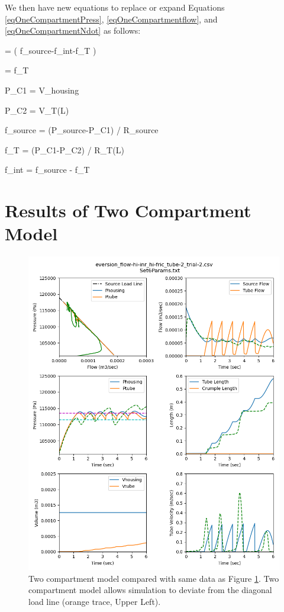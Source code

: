\documentclass[letterpaper]{article}
\begin{document}
We then have new equations to replace or expand Equations \ref{eqOneCompartmentPress}, \ref{eqOneCompartmentflow}, and \ref{eqOneCompartmentNdot}
as follows:

\beq
{} = ( f_{source}-f_{int}-f_T ) \cdot {}
\eeq

\beq
{} =   f_T \cdot {}
\eeq

\beq
P_{C1} =   {V_{housing}}
\eeq

\beq
P_{C2} =   {V_T(L)}
\eeq

\beq
f_{source} = (P_{source}-P_{C1}) /  R_{source}
\eeq

\beq
f_{T} = (P_{C1}-P_{C2}) /  R_{T}(L)
\eeq

\beq
f_{int} = f_{source} - f_T
\eeq

\section{Results of Two Compartment Model}

\begin{figure}[h]\centering
\includegraphics[width=.75\textwidth]{2CompSimulationSet6.png}
\caption{Two compartment model compared with same data as Figure \ref{}.
Two compartment model allows simulation to deviate from the diagonal load line (orange trace,
Upper Left).}
\label{Fig:2CompS6}
\end{figure}
\end{document}
